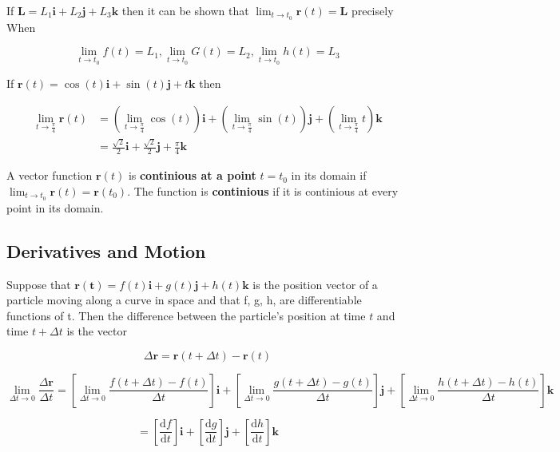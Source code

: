 \documentclass[12pt,a4paper]{article}
\newenvironment{definition}{\begin{definitionbox}}{\end{definitionbox}\vspace{1\baselineskip}}
\begin{document}
If \(\mathbf{L} = \mathit{L}_1\mathbf{i} + \mathit{L}_2\mathbf{j} + \mathit{L}_3\mathbf{k}\) then it can be shown that \(\lim_{t \to t_0} \mathbf{r}(t) = \mathbf{L}\) precisely When

\[\lim_{t \to t_0} f(t) =L_1, \lim_{t \to t_0} G(t) = L_2 , \lim_{t \to t_0} h(t) = L_3\]

\begin{example}
  If \(\mathbf{r}(t) = \cos(t)\mathbf{i} + \sin(t)\mathbf{j}+ t\mathbf{k}\) then

  \begin{align}
    \lim_{t \to \frac{\pi}{4}}\mathbf{r}(t) &= \left(\lim_{t \to \frac{\pi}{4}}\cos(t)\right)\mathbf{i} + \left(\lim_{t \to \frac{\pi}{4}}\sin(t)\right)\mathbf{j}+ \left(\lim_{t \to \frac{\pi}{4}}t\right)\mathbf{k} \\
    &=\frac{\sqrt{2}}{2}\mathbf{i} + \frac{\sqrt{2}}{2}\mathbf{j} + \frac{\pi}{4}\mathbf{k}
\end{align}

\begin{definition}
  A vector function \(\mathbf{r}(t)\) is \textbf{continious at a point} \(t = t_0\) in its domain if \(\lim_{t \to t_0} \mathbf{r}(t) = \mathbf{r}(t_0)\).
  The function is \textbf{continious} if it is continious at every point in its domain.
\end{definition}

\subsection{Derivatives and Motion}

Suppose that \(\mathbf{r(t)} = f(t)\mathbf{i} + g(t)\mathbf{j} + h(t)\mathbf{k}\) is the position vector of  a particle moving along a curve in space and that f, g, h, are differentiable functions of t.
Then the difference between the particle's position at time \(t\) and time \(t + \Delta t\) is the vector

\[\Delta \mathbf{r} = \mathbf{r}(t + \Delta t) - \mathbf{r}(t)\]



{\small
\[
\lim_{\Delta t \to 0}\frac{\Delta \mathbf{r}}{\Delta t} = \left[\lim_{\Delta t \to 0}\frac{f(t + \Delta t) - f(t)}{\Delta t}\right] \mathbf{i} + \left[\lim_{\Delta t \to 0}\frac{g(t + \Delta t) - g(t)}{\Delta t}\right] \mathbf{j} + \left[\lim_{\Delta t \to 0}\frac{h(t + \Delta t) - h(t)}{\Delta t}\right] \mathbf{k}
\]
}

\[= \left[\frac{\mathrm{d}f}{\mathrm{d}t}\right]\mathbf{i} + \left[\frac{\mathrm{d}g}{\mathrm{d}t}\right]\mathbf{j}+ \left[\frac{\mathrm{d}h}{\mathrm{d}t}\right]\mathbf{k}\]


\end{example}
\end{document}
